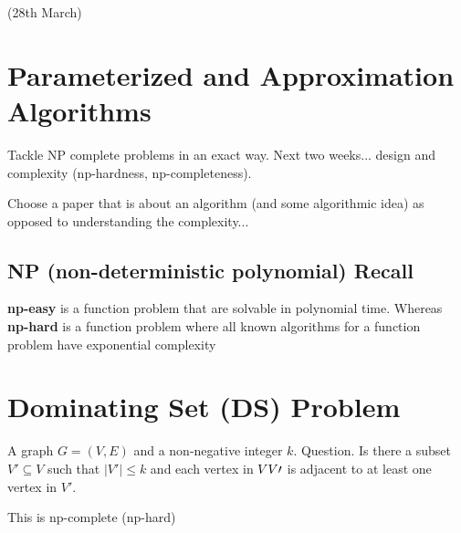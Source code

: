 \documentclass{article}
\begin{document}
(28th March)
\section*{Parameterized and Approximation Algorithms}
Tackle NP complete problems in an exact way. Next two weeks... design and complexity (np-hardness, np-completeness).

Choose a paper that is about an algorithm (and some algorithmic idea) as opposed to understanding the complexity...

\subsection{NP (non-deterministic polynomial) Recall}
{\bf np-easy} is a function problem that are solvable in polynomial time. Whereas {\bf np-hard} is a function problem where all known algorithms for a function problem have exponential complexity

\section{Dominating Set (DS) Problem}
A graph $G=(V,E)$ and a non-negative integer $k$. Question. Is there a subset $V\prime \subseteq V$ such that $|V\prime| \leq k$ and each vertex in $V\\V\prime$ is adjacent to at least one vertex in $V\prime$.

This is np-complete (np-hard)
\end{document}
